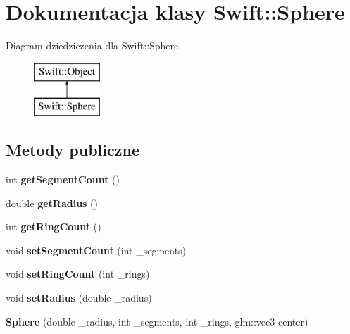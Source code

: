 \hypertarget{class_swift_1_1_sphere}{\section{Dokumentacja klasy Swift\-:\-:Sphere}
\label{class_swift_1_1_sphere}
}
Diagram dziedziczenia dla Swift\-:\-:Sphere\begin{figure}[H]
\begin{center}
\leavevmode
\includegraphics[height=2.000000cm]{class_swift_1_1_sphere}
\end{center}
\end{figure}
\subsection*{Metody publiczne}
\begin{DoxyCompactItemize}
\item 
\hypertarget{class_swift_1_1_sphere_a98b0f80678d54067f1b074289a220a08}{int {\bfseries get\-Segment\-Count} ()}\label{class_swift_1_1_sphere_a98b0f80678d54067f1b074289a220a08}

\item 
\hypertarget{class_swift_1_1_sphere_a252444234c0405da50fbb6a68574beba}{double {\bfseries get\-Radius} ()}\label{class_swift_1_1_sphere_a252444234c0405da50fbb6a68574beba}

\item 
\hypertarget{class_swift_1_1_sphere_af733f1fccaf3cd10ac6f36bbefb70d36}{int {\bfseries get\-Ring\-Count} ()}\label{class_swift_1_1_sphere_af733f1fccaf3cd10ac6f36bbefb70d36}

\item 
\hypertarget{class_swift_1_1_sphere_a8a611c6724d168cbec468e5eff28001f}{void {\bfseries set\-Segment\-Count} (int \-\_\-segments)}\label{class_swift_1_1_sphere_a8a611c6724d168cbec468e5eff28001f}

\item 
\hypertarget{class_swift_1_1_sphere_acfc2322a46181ddfa54a39023c032f6b}{void {\bfseries set\-Ring\-Count} (int \-\_\-rings)}\label{class_swift_1_1_sphere_acfc2322a46181ddfa54a39023c032f6b}

\item 
\hypertarget{class_swift_1_1_sphere_a1dc49ee4d701b304b0dc81862e72cc9c}{void {\bfseries set\-Radius} (double \-\_\-radius)}\label{class_swift_1_1_sphere_a1dc49ee4d701b304b0dc81862e72cc9c}

\item 
\hypertarget{class_swift_1_1_sphere_a553289d5fcf34b8ce82d205efecf190d}{{\bfseries Sphere} (double \-\_\-radius, int \-\_\-segments, int \-\_\-rings, glm\-::vec3 center)}\label{class_swift_1_1_sphere_a553289d5fcf34b8ce82d205efecf190d}

\end{DoxyCompactItemize}
